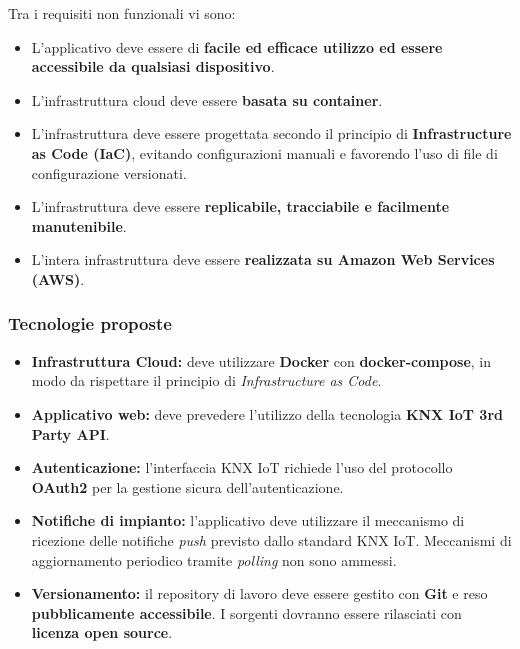 \documentclass[a4paper,11pt]{article}
\begin{document}
Tra i requisiti non funzionali vi sono:
\begin{itemize}
  \item L'applicativo deve essere di \textbf{facile ed efficace utilizzo ed essere accessibile da qualsiasi dispositivo}.
  \item L'infrastruttura cloud deve essere \textbf{basata su container}.
  \item L'infrastruttura deve essere progettata secondo il principio di \textbf{Infrastructure as Code (IaC)}, evitando configurazioni manuali e favorendo l'uso di file di configurazione versionati.
  \item L'infrastruttura deve essere \textbf{replicabile, tracciabile e facilmente manutenibile}.
  \item L'intera infrastruttura deve essere \textbf{realizzata su Amazon Web Services (AWS)}.
\end{itemize}

\subsubsection{Tecnologie proposte}
\begin{itemize}
 \item \textbf{Infrastruttura Cloud:} deve utilizzare \textbf{Docker} con \textbf{docker-compose}, in modo da rispettare il principio di \textit{Infrastructure as Code}.
 \item \textbf{Applicativo web:} deve prevedere l'utilizzo della tecnologia \textbf{KNX IoT 3rd Party API}.
 \item \textbf{Autenticazione:} l'interfaccia KNX IoT richiede l'uso del protocollo \textbf{OAuth2} per la gestione sicura dell'autenticazione.
 \item \textbf{Notifiche di impianto:} l'applicativo deve utilizzare il meccanismo di ricezione delle notifiche \textit{push} previsto dallo standard KNX IoT. 
 Meccanismi di aggiornamento periodico tramite \textit{polling} non sono ammessi.
 \item \textbf{Versionamento:} il repository di lavoro deve essere gestito con \textbf{Git} e reso \textbf{pubblicamente accessibile}. 
 I sorgenti dovranno essere rilasciati con \textbf{licenza open source}.
\end{itemize}
\end{document}
